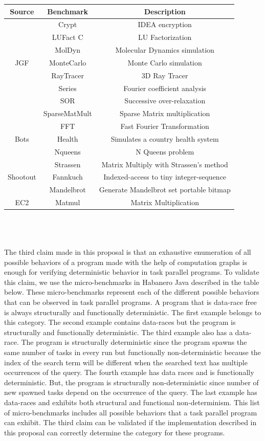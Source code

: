 \begin{tabular}{|c|c|c|}
\hline
\textbf{Source} & \textbf{Benchmark} & \textbf{Description} \\
\hline
\hline
      & Crypt & IDEA encryption \\
	& LUFact C & LU Factorization \\
  	   & MolDyn & Molecular Dynamics simulation \\
JGF & MonteCarlo & Monte Carlo simulation \\
      & RayTracer & 3D Ray Tracer \\
      & Series & Fourier coefficient analysis \\
      & SOR & Successive over-relaxation \\
      & SparseMatMult & Sparse Matrix multiplication \\
      \hline
      & FFT  & Fast Fourier Transformation \\
	Bots & Health & Simulates a country health system \\
& Nqueens & N Queens problem \\
& Strassen & Matrix Multiply with Strassen’s method \\
\hline
Shootout & Fannkuch & Indexed-access to tiny integer-sequence \\
& Mandelbrot & Generate Mandelbrot set portable bitmap \\
\hline
EC2 & Matmul & Matrix Multiplication \\
\hline
\end{tabular}
\\
\\
\\
The third claim made in this proposal is that an exhaustive enumeration of all possible behaviors of a program made with the help of computation graphs is enough for verifying deterministic behavior in task parallel programs. To validate this claim, we use the micro-benchmarks in Habanero Java described in the table below. These micro-benchmarks represent each of the different possible behaviors that can be observed in task parallel programs. A program that is data-race free is always structurally and functionally deterministic. The first example belongs to this category. The second example contains data-races but the program is structurally and functionally deterministic. The third example also has a data-race. The program is structurally deterministic since the program spawns the same number of tasks in every run but functionally non-deterministic because the index of the search term will be different when the searched text has multiple occurrences of the query. The fourth example has data races and is functionally deterministic. But, the program is structurally non-deterministic since number of new spawned tasks depend on the occurrence of the query. The last example has data-races and exhibits both structural and functional non-determinism. This list of micro-benchmarks includes all possible behaviors that a task parallel program can exhibit. The third claim can be validated if the implementation described in this proposal can correctly determine the category for these programs. \\

